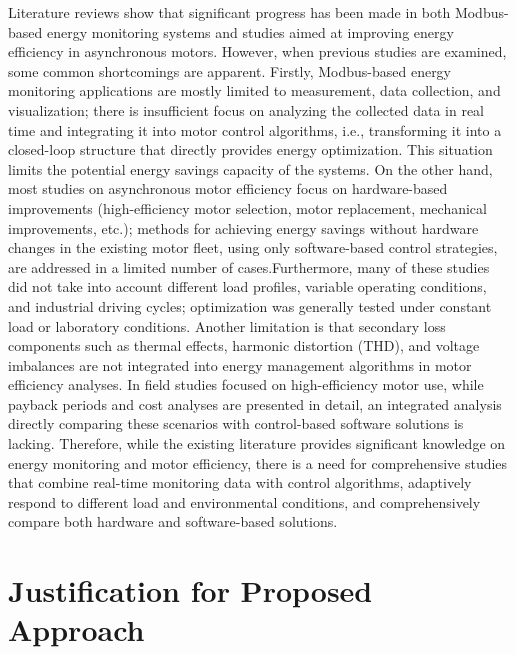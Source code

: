 Literature reviews show that significant progress has been made in both Modbus-based energy monitoring systems and studies aimed at improving energy efficiency in asynchronous motors. However, when previous studies are examined, some common shortcomings are apparent. Firstly, Modbus-based energy monitoring applications are mostly limited to measurement, data collection, and visualization; there is insufficient focus on analyzing the collected data in real time and integrating it into motor control algorithms, i.e., transforming it into a closed-loop structure that directly provides energy optimization. This situation limits the potential energy savings capacity of the systems. On the other hand, most studies on asynchronous motor efficiency focus on hardware-based improvements (high-efficiency motor selection, motor replacement, mechanical improvements, etc.); methods for achieving energy savings without hardware changes in the existing motor fleet, using only software-based control strategies, are addressed in a limited number of cases.Furthermore, many of these studies did not take into account different load profiles, variable operating conditions, and industrial driving cycles; optimization was generally tested under constant load or laboratory conditions. Another limitation is that secondary loss components such as thermal effects, harmonic distortion (THD), and voltage imbalances are not integrated into energy management algorithms in motor efficiency analyses. In field studies focused on high-efficiency motor use, while payback periods and cost analyses are presented in detail, an integrated analysis directly comparing these scenarios with control-based software solutions is lacking. Therefore, while the existing literature provides significant knowledge on energy monitoring and motor efficiency, there is a need for comprehensive studies that combine real-time monitoring data with control algorithms, adaptively respond to different load and environmental conditions, and comprehensively compare both hardware and software-based solutions.

\section{Justification for Proposed Approach}


